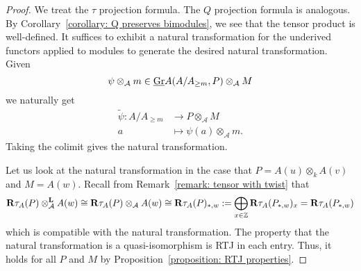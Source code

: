 \begin{proof}
  We treat the \(\tau\) projection formula. The \(Q\) projection formula is analogous. By Corollary~\ref{corollary: Q preserves bimodules}, we see that the tensor product is well-defined. It suffices to exhibit a natural transformation for the underived functors applied to modules to generate the desired natural transformation. Given
  \begin{displaymath}
    \psi \otimes_{\mathcal A} m \in \underline{\operatorname{Gr}}A(A/A_{\geq m}, P) \otimes_{\mathcal A} M 
  \end{displaymath}
  we naturally get 
  \begin{align*}
    \widetilde{\psi} : A/A_{\geq m} & \to P \otimes_{\mathcal A} M \\
    a & \mapsto \psi(a) \otimes_{\mathcal A} m. 
  \end{align*}
  Taking the colimit gives the natural transformation.
  
  Let us look at the natural transformation in the case that \(P = A(u) \otimes_k A(v)\) and \(M = A(w)\).
  Recall from Remark~\ref{remark: tensor with twist} that
  \[
  \mathbf{R}\tau_A(P) \otimes_{\mathcal{A}}^\mathbf{L} A(w) \cong \mathbf{R}\tau_A(P) \otimes_{\mathcal{A}} A(w) \cong \mathbf{R}\tau_A(P)_{\ast,w} 
  := \bigoplus_{x \in \mathbb{Z}} \mathbf{R}\tau_A(P_{\ast,w})_x
  = \mathbf{R}\tau_A(P_{\ast,w})
  \]
  which is compatible with the natural transformation.
  The property that the natural transformation is a quasi-isomorphism is RTJ in each entry.
  Thus, it holds for all \(P\) and \(M\) by Proposition~\ref{proposition: RTJ properties}.
\end{proof}

